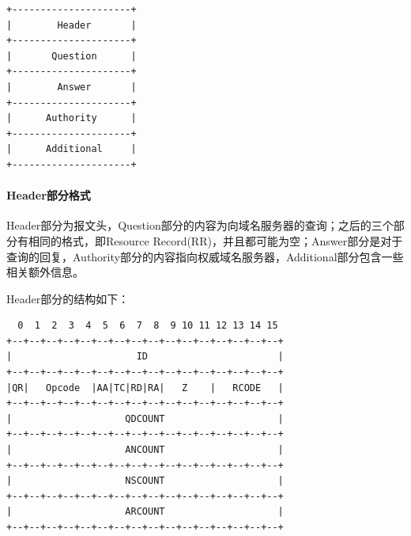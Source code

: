 \documentclass[lang=cn,11pt,a4paper,cite=authornum]{paper}
\begin{document}
\begin{code}
\begin{verbatim}
+---------------------+
|        Header       |
+---------------------+
|       Question      |
+---------------------+
|        Answer       |
+---------------------+
|      Authority      |
+---------------------+
|      Additional     |
+---------------------+
\end{verbatim}
\end{code}

\paragraph{Header部分格式}

Header部分为报文头，Question部分的内容为向域名服务器的查询；之后的三个部分有相同的格式，即Resource Record(RR)，并且都可能为空；Answer部分是对于查询的回复，Authority部分的内容指向权威域名服务器，Additional部分包含一些相关额外信息。

Header部分的结构如下：

\begin{code}
\begin{verbatim}
  0  1  2  3  4  5  6  7  8  9 10 11 12 13 14 15
+--+--+--+--+--+--+--+--+--+--+--+--+--+--+--+--+
|                      ID                       |
+--+--+--+--+--+--+--+--+--+--+--+--+--+--+--+--+
|QR|   Opcode  |AA|TC|RD|RA|   Z    |   RCODE   |
+--+--+--+--+--+--+--+--+--+--+--+--+--+--+--+--+
|                    QDCOUNT                    |
+--+--+--+--+--+--+--+--+--+--+--+--+--+--+--+--+
|                    ANCOUNT                    |
+--+--+--+--+--+--+--+--+--+--+--+--+--+--+--+--+
|                    NSCOUNT                    |
+--+--+--+--+--+--+--+--+--+--+--+--+--+--+--+--+
|                    ARCOUNT                    |
+--+--+--+--+--+--+--+--+--+--+--+--+--+--+--+--+
\end{verbatim}
\end{code}
\end{document}
